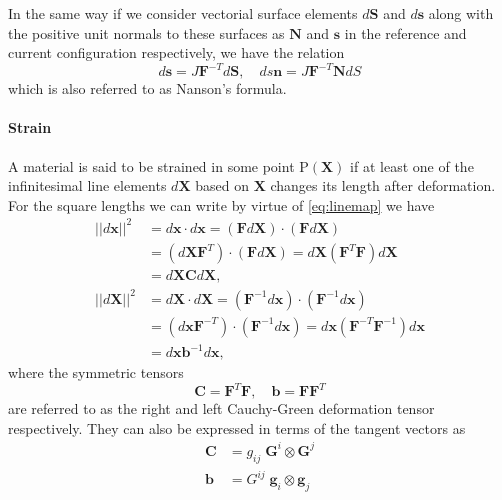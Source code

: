 In the same way if we consider vectorial surface elements \(d\bm{S}\) and \(d\bm{s}\) along with the positive unit normals to these surfaces as \(\bm{N}\) and \(\bm{s}\) in the reference and current configuration respectively, we have the relation 
\begin{equation}
    d\bm{s} = J\mathbf{F}^{-T}d\bm{S},\quad ds\bm{n} = J\mathbf{F}^{-T}\bm{N}dS
    \label{eq:nanson}
\end{equation}
which is also referred to as Nanson's formula.

\paragraph*{Strain}
A material is said to be strained in some point \(\text{P}(\bm{X})\) if at least one of the infinitesimal line elements \(d\bm{X}\) based on \(\bm{X}\) changes its length after deformation. For the square lengths we can write by virtue of \cref{eq:linemap} we have
\begin{align}
    \nonumber||d\bm{x}||^{2} 
             &= d\bm{x} \cdot d\bm{x} 
              = (\mathbf{F} d\bm{X}) \cdot (\mathbf{F} d\bm{X})\\
    \nonumber&= (d\bm{X}\mathbf{F}^{T}) \cdot (\mathbf{F} d\bm{X}) 
              = d\bm{X} (\mathbf{F}^{T} \mathbf{F}) d\bm{X}\\
             &= d\bm{X} \mathbf{C} d\bm{X},\label{eq:sqlen_cur}\\[1em]
    \nonumber||d\bm{X}||^{2} 
             &= d\bm{X} \cdot d\bm{X} 
              = (\mathbf{F}^{-1} d\bm{x}) \cdot (\mathbf{F}^{-1} d\bm{x})\\
    \nonumber&= (d\bm{x}\mathbf{F}^{-T}) \cdot (\mathbf{F}^{-1} d\bm{x}) 
              = d\bm{x} (\mathbf{F}^{-T} \mathbf{F}^{-1}) d\bm{x}\\
             &= d\bm{x} \mathbf{b}^{-1} d\bm{x},\label{eq:sqlen_ref}
\end{align}
where the symmetric tensors 
\begin{equation}
    \mathbf{C} = \mathbf{F}^{T}\mathbf{F}, \quad
    \mathbf{b} = \mathbf{F}\mathbf{F}^{T}
    \label{eq:def_right_left_cauchygreen}
\end{equation}
are referred to as the right and left Cauchy-Green deformation tensor respectively.
They can also be expressed in terms of the tangent vectors as
\begin{align}
    \mathbf{C} &= g_{ij} \;\bm{G}^{i} \otimes \bm{G}^{j}\\
    \mathbf{b} &= G^{ij} \;\bm{g}_{i} \otimes \bm{g}_{j}
\end{align}
